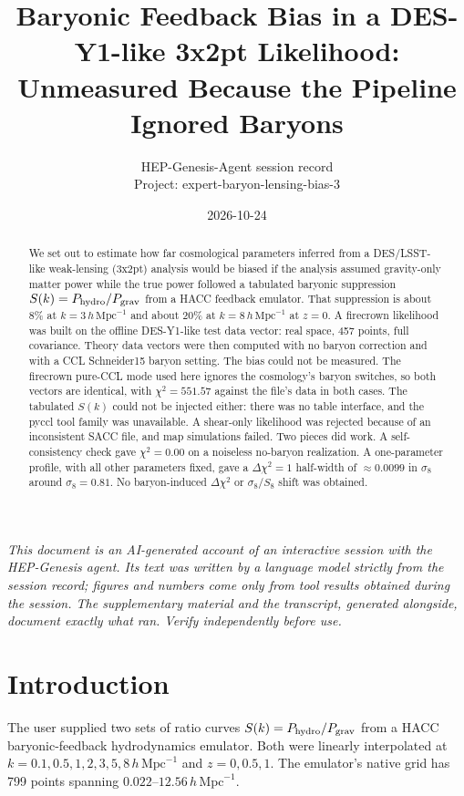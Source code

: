 \documentclass[11pt,a4paper]{article}
\title{Baryonic Feedback Bias in a DES-Y1-like 3x2pt Likelihood: Unmeasured Because the Pipeline Ignored Baryons}
\author{HEP-Genesis-Agent session record \\ \small Project: expert-baryon-lensing-bias-3}
\date{2026-10-24}
\begin{document}
\maketitle
\noindent\textit{\small This document is an AI-generated account of an interactive session with the HEP-Genesis agent. Its text was written by a language model strictly from the session record; figures and numbers come only from tool results obtained during the session. The supplementary material and the transcript, generated alongside, document exactly what ran. Verify independently before use.}
\vspace{1em}

\begin{abstract}
We set out to estimate how far cosmological parameters inferred from a DES/LSST-like weak-lensing (3x2pt) analysis would be biased if the analysis assumed gravity-only matter power while the true power followed a tabulated baryonic suppression $S(k)=P_{\rm hydro}/P_{\rm grav}$ from a HACC feedback emulator. That suppression is about 8\% at $k=3\,h\,\mathrm{Mpc}^{-1}$ and about 20\% at $k=8\,h\,\mathrm{Mpc}^{-1}$ at $z=0$. A firecrown likelihood was built on the offline DES-Y1-like test data vector: real space, 457 points, full covariance. Theory data vectors were then computed with no baryon correction and with a CCL Schneider15 baryon setting. The bias could not be measured. The firecrown pure-CCL mode used here ignores the cosmology's baryon switches, so both vectors are identical, with $\chi^2=551.57$ against the file's data in both cases. The tabulated $S(k)$ could not be injected either: there was no table interface, and the pyccl tool family was unavailable. A shear-only likelihood was rejected because of an inconsistent SACC file, and map simulations failed. Two pieces did work. A self-consistency check gave $\chi^2=0.00$ on a noiseless no-baryon realization. A one-parameter profile, with all other parameters fixed, gave a $\Delta\chi^2=1$ half-width of $\approx0.0099$ in $\sigma_8$ around $\sigma_8=0.81$. No baryon-induced $\Delta\chi^2$ or $\sigma_8/S_8$ shift was obtained.
\end{abstract}

\section{Introduction}
The user supplied two sets of ratio curves $S(k)=P_{\rm hydro}/P_{\rm grav}$ from a HACC baryonic-feedback hydrodynamics emulator. Both were linearly interpolated at $k=0.1,0.5,1,2,3,5,8\,h\,\mathrm{Mpc}^{-1}$ and $z=0,0.5,1$. The emulator's native grid has 799 points spanning $0.022$--$12.56\,h\,\mathrm{Mpc}^{-1}$.
\end{document}
